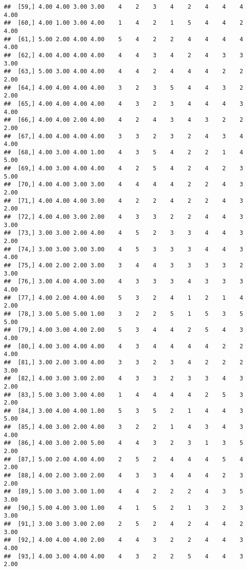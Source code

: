 \documentclass[]{article}
\begin{document}
\begin{verbatim}
##  [59,] 4.00 4.00 3.00 3.00    4    2    3    4    2    4    4    4 4.00
##  [60,] 4.00 1.00 3.00 4.00    1    4    2    1    5    4    4    2 4.00
##  [61,] 5.00 2.00 4.00 4.00    5    4    2    2    4    4    4    4 4.00
##  [62,] 4.00 4.00 4.00 4.00    4    4    3    4    2    4    3    3 3.00
##  [63,] 5.00 3.00 4.00 4.00    4    4    2    4    4    4    2    2 2.00
##  [64,] 4.00 4.00 4.00 4.00    3    2    3    5    4    4    3    2 2.00
##  [65,] 4.00 4.00 4.00 4.00    4    3    2    3    4    4    4    3 4.00
##  [66,] 4.00 4.00 2.00 4.00    4    2    4    3    4    3    2    2 2.00
##  [67,] 4.00 4.00 4.00 4.00    3    3    2    3    2    4    3    4 4.00
##  [68,] 4.00 3.00 4.00 1.00    4    3    5    4    2    2    1    4 5.00
##  [69,] 4.00 3.00 4.00 4.00    4    2    5    4    2    4    2    3 5.00
##  [70,] 4.00 4.00 3.00 3.00    4    4    4    4    2    2    4    3 2.00
##  [71,] 4.00 4.00 4.00 3.00    4    2    2    4    2    2    4    3 2.00
##  [72,] 4.00 4.00 3.00 2.00    4    3    3    2    2    4    4    3 3.00
##  [73,] 3.00 3.00 2.00 4.00    4    5    2    3    3    4    4    3 2.00
##  [74,] 3.00 3.00 3.00 3.00    4    5    3    3    3    4    4    3 4.00
##  [75,] 4.00 2.00 2.00 3.00    3    4    4    3    3    3    3    2 3.00
##  [76,] 3.00 4.00 4.00 3.00    4    3    3    3    4    3    3    3 4.00
##  [77,] 4.00 2.00 4.00 4.00    5    3    2    4    1    2    1    4 2.00
##  [78,] 3.00 5.00 5.00 1.00    3    2    2    5    1    5    3    5 5.00
##  [79,] 4.00 3.00 4.00 2.00    5    3    4    4    2    5    4    3 4.00
##  [80,] 4.00 3.00 4.00 4.00    4    3    4    4    4    4    2    2 4.00
##  [81,] 3.00 2.00 3.00 4.00    3    3    2    3    4    2    2    2 3.00
##  [82,] 4.00 3.00 3.00 2.00    4    3    3    2    3    3    4    3 2.00
##  [83,] 5.00 3.00 3.00 4.00    1    4    4    4    4    2    5    3 2.00
##  [84,] 3.00 4.00 4.00 1.00    5    3    5    2    1    4    4    3 5.00
##  [85,] 4.00 3.00 2.00 4.00    3    2    2    1    4    3    4    3 4.00
##  [86,] 4.00 3.00 2.00 5.00    4    4    3    2    3    1    3    5 2.00
##  [87,] 5.00 2.00 4.00 4.00    2    5    2    4    4    4    5    4 2.00
##  [88,] 4.00 2.00 3.00 2.00    4    3    3    4    4    4    2    3 2.00
##  [89,] 5.00 3.00 3.00 1.00    4    4    2    2    2    4    3    5 3.00
##  [90,] 5.00 4.00 3.00 1.00    4    1    5    2    1    3    2    3 3.00
##  [91,] 3.00 3.00 3.00 2.00    2    5    2    4    2    4    4    2 3.00
##  [92,] 4.00 4.00 4.00 2.00    4    4    3    2    2    4    4    3 4.00
##  [93,] 4.00 3.00 4.00 4.00    4    3    2    2    5    4    4    3 2.00

\end{verbatim}
\end{document}
